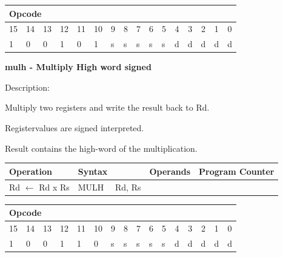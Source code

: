 \documentclass[%
	pdftex,
	a4paper,
	oneside,
	bibtotoc,%
	idxtotoc,%
	bibtotocnumbered,
	halfparskip,%
]{scrbook}
\begin{document}
\begin{tabular}{|c|c|c|c|c|c|c|c|c|c|c|c|c|c|c|c|}
\hline
\multicolumn{6}{|l|}{Opcode} & \multicolumn{5}{|l|}{} & \multicolumn{5}{|l|}{
} \\ \hline
15 & 14 & 13 & 12 & 11 & 10 & 9 & 8 & 7 & 6 & 5 & 4 & 3 & 2 & 1 & 0 \\ \hline
\multicolumn{1}{|l|}{1} & \multicolumn{1}{|l|}{0} & \multicolumn{1}{|l|}{0}
& \multicolumn{1}{|l|}{1} & \multicolumn{1}{|l|}{0} & \multicolumn{1}{|l|}{1}
& \multicolumn{1}{|l|}{s} & \multicolumn{1}{|l|}{s} & \multicolumn{1}{|l|}{s}
& \multicolumn{1}{|l|}{s} & \multicolumn{1}{|l|}{s} & \multicolumn{1}{|l|}{d}
& \multicolumn{1}{|l|}{d} & \multicolumn{1}{|l|}{d} & \multicolumn{1}{|l|}{d}
& \multicolumn{1}{|l|}{d} \\ \hline
\end{tabular}

\bigskip

\textbf{mulh - Multiply High word signed}

Description:

Multiply two registers and write the result back to Rd.

Registervalues are signed interpreted.

Result contains the high-word of the multiplication.

\begin{tabular}{|l|l|l|l|}
\hline
Operation & Syntax & Operands & Program Counter \\ \hline
Rd $\leftarrow $ Rd x Rs & MULH \ \ Rd, Rs &  &  \\ \hline
\end{tabular}

\begin{tabular}{|c|c|c|c|c|c|c|c|c|c|c|c|c|c|c|c|}
\hline
\multicolumn{6}{|l|}{Opcode} & \multicolumn{5}{|l|}{} & \multicolumn{5}{|l|}{
} \\ \hline
15 & 14 & 13 & 12 & 11 & 10 & 9 & 8 & 7 & 6 & 5 & 4 & 3 & 2 & 1 & 0 \\ \hline
\multicolumn{1}{|l|}{1} & \multicolumn{1}{|l|}{0} & \multicolumn{1}{|l|}{0}
& \multicolumn{1}{|l|}{1} & \multicolumn{1}{|l|}{1} & \multicolumn{1}{|l|}{0}
& \multicolumn{1}{|l|}{s} & \multicolumn{1}{|l|}{s} & \multicolumn{1}{|l|}{s}
& \multicolumn{1}{|l|}{s} & \multicolumn{1}{|l|}{s} & \multicolumn{1}{|l|}{d}
& \multicolumn{1}{|l|}{d} & \multicolumn{1}{|l|}{d} & \multicolumn{1}{|l|}{d}
& \multicolumn{1}{|l|}{d} \\ \hline
\end{tabular}
\end{document}
